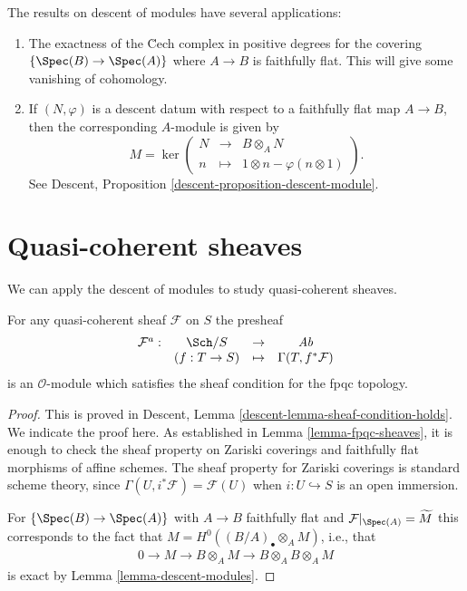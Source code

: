\begin{remarks}
\label{remarks-theorem-modules-exactness}
The results on descent of modules have several applications:
\begin{enumerate}
\item The exactness of the \u Cech complex in positive degrees for
the covering $\{\Spec(B) \to \Spec(A)\}$ where $A \to B$ is
faithfully flat. This will give some vanishing of cohomology.
\item If $(N, \varphi)$ is a descent datum with respect to a faithfully
flat map $A \to B$, then the corresponding $A$-module is given by
$$
M = \ker \left(
\begin{matrix}
N & \longrightarrow & B \otimes_A N \\
n & \longmapsto & 1 \otimes n - \varphi(n \otimes 1)
\end{matrix}
\right).
$$
See
Descent, Proposition \ref{descent-proposition-descent-module}.
\end{enumerate}
\end{remarks}




\section{Quasi-coherent sheaves}
\label{section-quasi-coherent}

\noindent
We can apply the descent of modules to study quasi-coherent sheaves.

\begin{proposition}
\label{proposition-quasi-coherent-sheaf-fpqc}
For any quasi-coherent sheaf $\mathcal{F}$ on $S$ the presheaf
$$
\begin{matrix}
\mathcal{F}^a : & \Sch/S & \to & \textit{Ab}\\
& (f: T \to S) &\mapsto & \Gamma(T, f^*\mathcal{F})
\end{matrix}
$$
is an $\mathcal{O}$-module which satisfies the sheaf condition for the
fpqc topology.
\end{proposition}

\begin{proof}
This is proved in
Descent, Lemma \ref{descent-lemma-sheaf-condition-holds}.
We indicate the proof here. As established in
Lemma \ref{lemma-fpqc-sheaves},
it is enough to check the sheaf property
on Zariski coverings and faithfully flat morphisms of affine schemes. The
sheaf property for Zariski coverings is standard scheme theory, since
$\Gamma(U, i^\ast \mathcal{F}) = \mathcal{F}(U)$ when
$i : U \hookrightarrow S$ is an open immersion.

\medskip\noindent
For $\left\{\Spec(B)\to \Spec(A)\right\}$ with $A\to B$ faithfully
flat and
$\mathcal{F}|_{\Spec(A)} = \widetilde{M}$
this corresponds to the fact that
$M = H^0\left((B/A)_\bullet \otimes_A M \right)$, i.e., that
\begin{align*}
0 \to M \to B \otimes_A M \to B \otimes_A B \otimes_A M
\end{align*}
is exact by
Lemma \ref{lemma-descent-modules}.
\end{proof}

